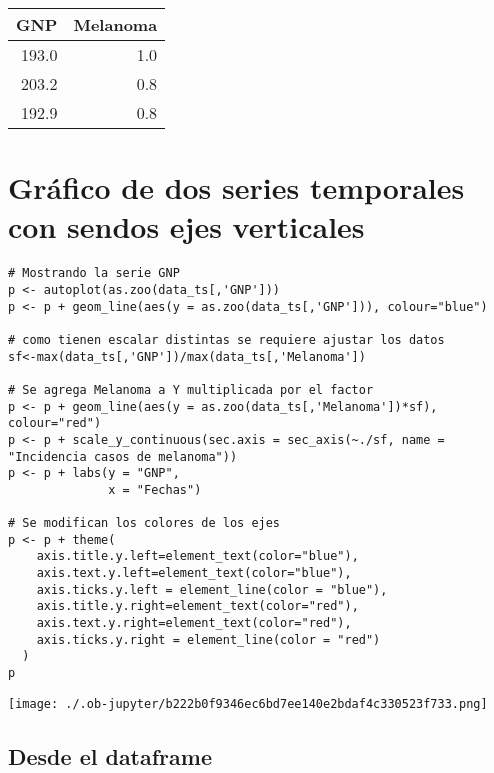 \documentclass[11pt]{article}
\begin{document}
\label{}
\begin{center}
\begin{tabular}{rr}
GNP & Melanoma\\
\hline
193.0 & 1.0\\
203.2 & 0.8\\
192.9 & 0.8\\
\end{tabular}
\end{center}
\section{Gráfico de dos series temporales con sendos ejes verticales}
\label{sec:org68b5d49}

\begin{verbatim}
# Mostrando la serie GNP
p <- autoplot(as.zoo(data_ts[,'GNP']))
p <- p + geom_line(aes(y = as.zoo(data_ts[,'GNP'])), colour="blue")

# como tienen escalar distintas se requiere ajustar los datos
sf<-max(data_ts[,'GNP'])/max(data_ts[,'Melanoma'])

# Se agrega Melanoma a Y multiplicada por el factor
p <- p + geom_line(aes(y = as.zoo(data_ts[,'Melanoma'])*sf), colour="red")
p <- p + scale_y_continuous(sec.axis = sec_axis(~./sf, name = "Incidencia casos de melanoma"))
p <- p + labs(y = "GNP",
              x = "Fechas")

# Se modifican los colores de los ejes
p <- p + theme(
    axis.title.y.left=element_text(color="blue"),
    axis.text.y.left=element_text(color="blue"),
    axis.ticks.y.left = element_line(color = "blue"),
    axis.title.y.right=element_text(color="red"),
    axis.text.y.right=element_text(color="red"),
    axis.ticks.y.right = element_line(color = "red")
  )
p
\end{verbatim}

\label{}
\begin{center}
\texttt{[image: ./.ob-jupyter/b222b0f9346ec6bd7ee140e2bdaf4c330523f733.png]}
\end{center}
\subsection{Desde el dataframe}
\label{sec:orgec9220e}
\end{document}

